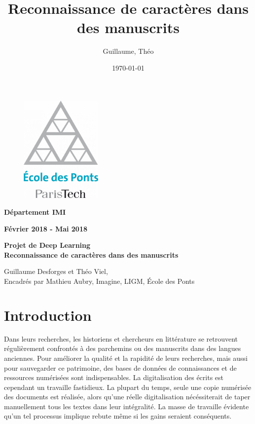 \documentclass{report}
\title{Reconnaissance de caractères dans des manuscrits}
\date{\today}
\author{\bsc{Desforges} Guillaume, \bsc{Viel} Théo}
\begin{document}
\thispagestyle{empty}
\begin{center}

    \begin{figure}[!htb]
        \begin{center}
            \includegraphics[width=4cm]{logo_enpc.png}
        \end{center}
    \end{figure}

    \vspace{0.5cm}

    {\large{\bf Département IMI}}

    \vspace{0.2cm}

    {\large{\bf Février 2018 - Mai 2018}}

    \vspace{1.5cm}

    \large{ \bf Projet de Deep Learning}\\
    \vspace{0.2cm}
    {\Large{\bf Reconnaissance de caractères dans des manuscrits}}

    \vspace{1cm}

    \large{Guillaume Desforges et Théo Viel},\\
    \vspace{0.2cm}
    \large{Encadrés par Mathieu Aubry, Imagine, LIGM, École des Ponts}

\end{center}
\newpage

\chapter*{Introduction}

Dans leurs recherches, les historiens et chercheurs en littérature se retrouvent régulièrement confrontés à des parchemins ou des manuscrits dans des langues anciennes.
Pour améliorer la qualité et la rapidité de leurs recherches, mais aussi pour sauvegarder ce patrimoine, des bases de données de connaissances et de ressources numérisées sont indispensables.
La digitalisation des écrits est cependant un travaille fastidieux.
La plupart du temps, seule une copie numérisée des documents est réalisée, alors qu'une réelle digitalisation nécéssiterait de taper manuellement tous les textes dans leur intégralité.
La masse de travaille évidente qu'un tel processus implique rebute même si les gains seraient conséquents.
\end{document}
